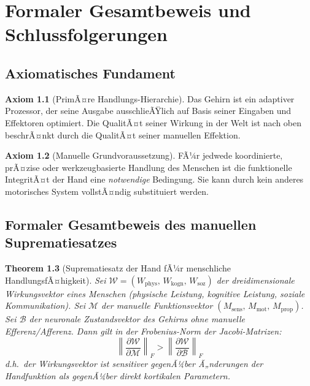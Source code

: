 ﻿\documentclass[12pt,a4paper]{report}
\theoremstyle{plain}
\newtheorem{theorem}{Theorem}[section]
\theoremstyle{definition}
\newtheorem{axiom}[theorem]{Axiom}
\theoremstyle{remark}
\begin{document}
\chapter{Formaler Gesamtbeweis und Schlussfolgerungen}
\label{chap:beweis}

\section{Axiomatisches Fundament}

\begin{axiom}[PrimÃ¤re Handlungs-Hierarchie]
\label{ax:primaer}
Das Gehirn ist ein adaptiver Prozessor, der seine Ausgabe ausschlieÃŸlich
auf Basis seiner Eingaben und Effektoren optimiert. Die QualitÃ¤t seiner
Wirkung in der Welt ist nach oben beschrÃ¤nkt durch die QualitÃ¤t seiner
manuellen Effektion.
\end{axiom}

\begin{axiom}[Manuelle Grundvoraussetzung]
\label{ax:manuell}
FÃ¼r jedwede koordinierte, prÃ¤zise oder werkzeugbasierte Handlung des Menschen
ist die funktionelle IntegritÃ¤t der Hand eine \emph{notwendige} Bedingung.
Sie kann durch kein anderes motorisches System vollstÃ¤ndig substituiert werden.
\end{axiom}

\section{Formaler Gesamtbeweis des manuellen Suprematiesatzes}
\label{sec:formaler_beweis}

\begin{theorem}[Suprematiesatz der Hand fÃ¼r menschliche HandlungsfÃ¤higkeit]
\label{thm:supremat}
Sei $\mathcal{W} = (W_{\text{phys}},\, W_{\text{kogn}},\, W_{\text{soz}})$
der dreidimensionale \emph{Wirkungsvektor} eines Menschen (physische Leistung,
kognitive Leistung, soziale Kommunikation). Sei $\mathcal{M}$  der manuelle
Funktionsvektor $(M_{\text{sens}},\, M_{\text{mot}},\, M_{\text{prop}})$.
Sei $\mathcal{B}$ der neuronale Zustandsvektor des Gehirns ohne manuelle
Efferenz/Afferenz. Dann gilt in der Frobenius-Norm der Jacobi-Matrizen:
\[
  \left\|\frac{\partial \mathcal{W}}{\partial \mathcal{M}}\right\|_F
  > \left\|\frac{\partial \mathcal{W}}{\partial \mathcal{B}}\right\|_F
\]
d.h.\ der Wirkungsvektor ist sensitiver gegenÃ¼ber Ã„nderungen der Handfunktion
als gegenÃ¼ber direkt kortikalen Parametern.
\end{theorem}
\end{document}
